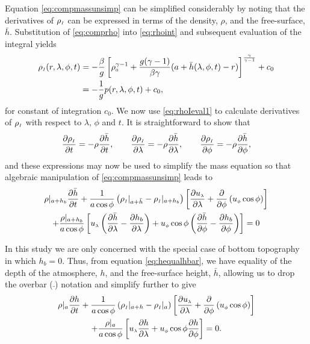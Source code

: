 Equation \eqref{eq:compmassunsimp} can be simplified considerably by noting that the derivatives of ${\rho_{\scriptscriptstyle I}}$ can be expressed in terms of the density, $\rho$, and the free-surface, $\bar{h}$. Substitution of \eqref{eq:comprho} into \eqref{eq:rhoint} and subsequent evaluation of the integral yields
\begin{align}
{\ensuremath{\rho_{\scriptscriptstyle I}}}(r,\lambda,\phi,t)&=-\frac{\beta}{g}\left[\rho^{\gamma-1}_{\scriptscriptstyle 0}+\frac{g(\gamma-1)}{\beta \gamma} (a+\bar{h}(\lambda,\phi,t)-r) \right]^{\frac{\gamma}{\gamma-1}}+c_0 \label{eq:rhoIeval1} \\
&=-\frac{1}{g}p(r,\lambda,\phi,t)+c_0, \label{eq:rhoIeval2}
\end{align}
for constant of integration $c_0$. We now use \eqref{eq:rhoIeval1} to calculate derivatives of ${\rho_{\scriptscriptstyle I}}$ with respect to $\lambda$, $\phi$ and $t$. It is straightforward to show that
\begin{equation*}
{\ensuremath{\frac{\partial {\ensuremath{\rho_{\scriptscriptstyle I}}}}{\partial t}}}=-\rho {\ensuremath{\frac{\partial \bar{h}}{\partial t}}}, \qquad {\ensuremath{\frac{\partial {\ensuremath{\rho_{\scriptscriptstyle I}}}}{\partial \lambda}}}=-\rho {\ensuremath{\frac{\partial \bar{h}}{\partial \lambda}}}, \qquad {\ensuremath{\frac{\partial {\ensuremath{\rho_{\scriptscriptstyle I}}}}{\partial \phi}}}=-\rho {\ensuremath{\frac{\partial \bar{h}}{\partial \phi}}},
\end{equation*} 
and these expressions may now be used to simplify the mass equation so that algebraic manipulation of \eqref{eq:compmassunsimp} leads to
\begin{multline}
\rho|_{a+h_b}{\frac{\partial \bar{h}}{\partial t}}+\frac{1}{a\cos\phi}\left({\rho_{\scriptscriptstyle I}}|_{a+\bar{h}}-{\rho_{\scriptscriptstyle I}}|_{a+h_b} \right)\left[ {\frac{\partial {\ensuremath{u_{\scriptscriptstyle \lambda}}}}{\partial \lambda}} + \frac{\partial}{\partial \phi}\left({u_{\scriptscriptstyle \phi}} \cos\phi \right) \right] \\
+\frac{\rho|_{a+h_b}}{a\cos\phi}\left[{u_{\scriptscriptstyle \lambda}} \left({\frac{\partial \bar{h}}{\partial \lambda}}-{\frac{\partial h_b}{\partial \lambda}} \right)+{u_{\scriptscriptstyle \phi}}\cos\phi\left({\frac{\partial \bar{h}}{\partial \phi}}-{\frac{\partial h_b}{\partial \phi}} \right) \right]=0 \label{eq:compmasssimp}
\end{multline}

In this study we are only concerned with the special case of bottom topography in which $h_b=0$. Thus, from equation \eqref{eq:hequalhbar}, we have equality of the depth of the atmosphere, $h$, and the free-surface height, $\bar{h}$, allowing us to drop the overbar ($\bar{\ }$) notation and simplify further to give
\begin{multline}
\rho|_{a}{\frac{\partial h}{\partial t}}+\frac{1}{a\cos\phi}\left({\rho_{\scriptscriptstyle I}}|_{a+h}-{\rho_{\scriptscriptstyle I}}|_{a} \right)\left[ {\frac{\partial {\ensuremath{u_{\scriptscriptstyle \lambda}}}}{\partial \lambda}} + \frac{\partial}{\partial \phi}\left({u_{\scriptscriptstyle \phi}} \cos\phi \right) \right] \\
+\frac{\rho|_{a}}{a\cos\phi}\left[{u_{\scriptscriptstyle \lambda}}{\frac{\partial h}{\partial \lambda}}+{u_{\scriptscriptstyle \phi}}\cos\phi {\ensuremath{\frac{\partial h}{\partial \phi}}}\right]=0. \label{eq:compmasssimpfur}
\end{multline}

